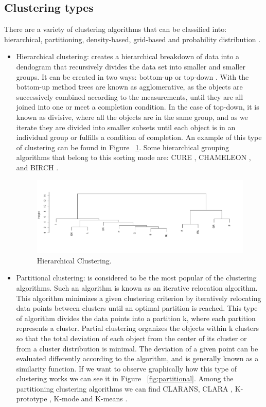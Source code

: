 \subsection{Clustering types}

There are a variety of clustering algorithms that can be classified into: hierarchical, partitioning, density-based, grid-based and probability distribution \citep{b8}.
\\
\begin{itemize}
  \item Hierarchical clustering: creates a hierarchical breakdown of data into a dendogram that recursively divides the data set into smaller and smaller groups. It can be created in two ways: bottom-up or top-down \citep{b19}. With the bottom-up method trees are known as agglomerative, as the objects are successively combined according to the measurements, until they are all joined into one or meet a completion condition. In the case of top-down, it is known as divisive, where all the objects are in the same group, and as we iterate they are divided into smaller subsets until each object is in an individual group or fulfills a condition of completion. An example of this type of clustering can be found in Figure ~\ref{fig:hierarchical}. Some hierarchical grouping algorithms that belong to this sorting mode are: CURE \citep{b20}, CHAMELEON \citep{b21}, and BIRCH \citep{b22}.
\begin{figure}[htbp]
  \centering
   \includegraphics[width=0.9\linewidth, height=0.2\textheight]{img/hierarchical.pdf}
    \caption{Hierarchical Clustering.}
    \label{fig:hierarchical}%
\end{figure}
  \item Partitional clustering: is considered to be the most popular of the clustering algorithms. Such an algorithm is known as an iterative relocation algorithm. This algorithm minimizes a given clustering criterion by iteratively relocating data points between clusters until an optimal partition is reached. This type of algorithm divides the data points into a partition k, where each partition represents a cluster. Partial clustering organizes the objects within k clusters so that the total deviation of each object from the center of its cluster or from a cluster distribution is minimal. The deviation of a given point can be evaluated differently according to the algorithm, and is generally known as a similarity function. If we want to observe graphically how this type of clustering works we can see it in Figure ~\ref{fig:partitional}. Among the partitioning clustering algorithms we can find CLARANS, CLARA \citep{b24}, K-prototype \citep{b25}, K-mode \citep{b26} and K-means \citep{b27}.

\end{itemize}
